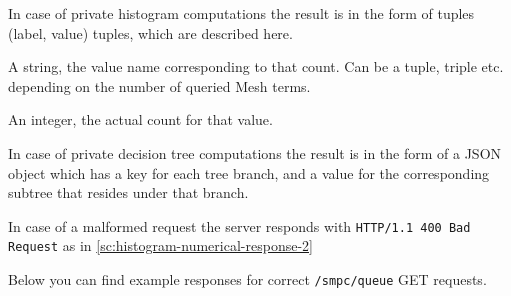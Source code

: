 \begin{description}[labelwidth=5em, leftmargin=\dimexpr\labelwidth+\labelsep\relax]
\begin{description}[labelwidth=4em, leftmargin=\dimexpr\labelwidth+\labelsep\relax]
    In case of private histogram computations the result is in the form of tuples (label, value) tuples, which are described here.
    \begin{description}[labelwidth=4em, leftmargin=\dimexpr\labelwidth+\labelsep\relax]
        \item [\texttt{label}:] A string, the value name corresponding to that count. Can be a tuple, triple etc. depending on the number of queried Mesh terms.
        \item [\texttt{value}:] An integer, the actual count for that value.
    \end{description}
    In case of private decision tree computations the result is in the form of a JSON object which has a key for each tree branch, and a value for the corresponding subtree that resides under that branch.
\end{description}

In case of a malformed request the server responds with \texttt{HTTP/1.1 400 Bad Request} as in \ref{sc:histogram-numerical-response-2}

Below you can find example responses for correct \texttt{/smpc/queue} GET requests.



\end{description}
